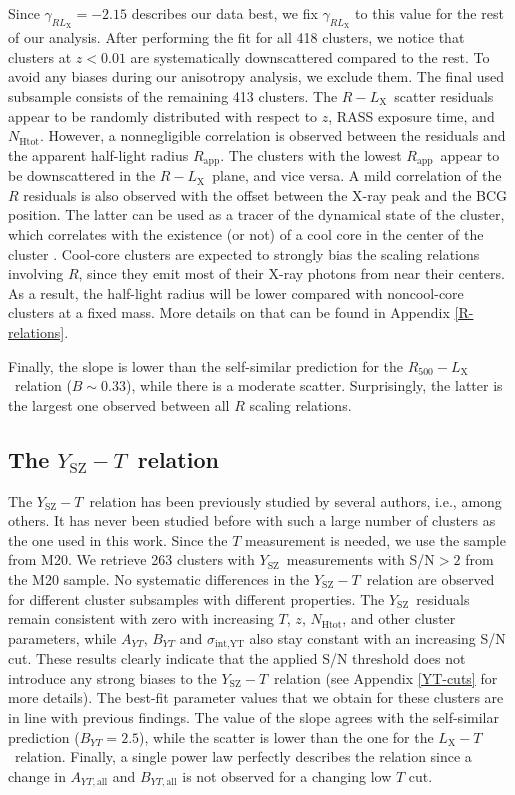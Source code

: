 \documentclass{aa}   %
\newcommand{\LT}{$L_{\text{X}}-T$}
\newcommand{\YT}{$Y_{\text{SZ}}-T$}
\newcommand{\RL}{$R-L_{\text{X}}$}
\newcommand{\Lx}{$L_{\text{X}}$}
\newcommand{\Ysz}{$Y_{\text{SZ}}$}
\newcommand{\nhtot}{$N_{\text{Htot}}$}
\newcommand{\Rapp}{$R_{\text{app}}$}
\begin{document}
Since $\gamma_{RL_{\text{X}}}=-2.15$ describes our data best, we fix $\gamma_{RL_{\text{X}}}$ to this value for the rest of our analysis. After performing the fit for all 418 clusters, we notice that clusters at $z<0.01$ are systematically downscattered compared to the rest. To avoid any biases during our anisotropy analysis, we exclude them. The final used subsample consists of the remaining 413 clusters. The \RL\ scatter residuals appear to be randomly distributed with respect to $z$, RASS exposure time, and \nhtot. However, a nonnegligible correlation is observed between the residuals and the apparent half-light radius \Rapp . The clusters with the lowest \Rapp\ appear to be downscattered in the \RL\ plane, and vice versa. A mild correlation of the $R$ residuals is also observed with the offset between the X-ray peak and the BCG position. The latter can be used as a tracer of the dynamical state of the cluster, which correlates with the existence (or not) of a cool core in the center of the cluster \citep[e.g.,][]{hudson,zitrin,rossetti,Lopes}. Cool-core clusters are expected to strongly bias the scaling relations involving $R$, since they emit most of their X-ray photons from near their centers. As a result, the half-light radius will be lower compared with noncool-core clusters at a fixed mass. More details on that can be found in Appendix \ref{R-relations}. 

Finally, the slope is lower than the self-similar prediction for the $R_{500}-$\Lx\ relation ($B\sim 0.33$), while there is a moderate scatter. Surprisingly, the latter is the largest one observed between all $R$ scaling relations. 

\subsection{The \YT\ relation}

The \YT\ relation has been previously studied by several authors, i.e., \citet{morandi,planck11b,Bender,ettori20} among others. It has never been studied before with such a large number of clusters as the one used in this work. Since the $T$ measurement is needed, we use the sample from M20. We retrieve 263 clusters with \Ysz\ measurements with S/N$>2$ from the M20 sample. No systematic differences in the \YT\ relation are observed for different cluster subsamples with different properties. The \Ysz\ residuals remain consistent with zero with increasing $T$, $z$, $N_{\text{Htot}}$, and other cluster parameters, while $A_{YT}$, $B_{YT}$ and $\sigma_{\text{int,YT}}$ also stay constant with an increasing S/N cut. These results clearly indicate that the applied S/N threshold does not introduce any strong biases to the \YT\ relation (see Appendix \ref{YT-cuts} for more details). The best-fit parameter values that we obtain for these clusters are in line with previous findings. The value of the slope agrees with the self-similar prediction ($B_{YT}=2.5$), while the scatter is lower than the one for the \LT\ relation. Finally, a single power law perfectly describes the relation since a change in $A_{YT,\text{all}}$ and $B_{YT,\text{all}}$ is not observed for a changing low $T$ cut.
\end{document}
